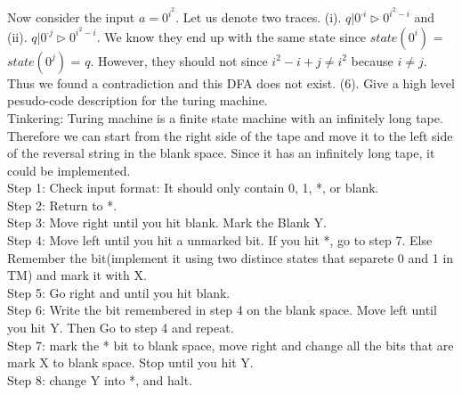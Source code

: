 \documentclass{article}
\begin{document}
	Now consider the input $a = 0^{i^2}$. Let us denote two traces. (i). $q|0^{\cdot i} \triangleright 0^{i^2-i}$ and (ii). $q|0^{\cdot j} \triangleright 0^{i^2-i}$. We know they end up with the same state since $state(0^i)$ = $state(0^j)$ = $q$.
	However, they should not since $i^2 - i +j \neq i^2$ because $i \neq j$. Thus we found a contradiction and this DFA does not exist.
	\newpage
	\noindent (6). Give a high level pesudo-code description for the turing machine.\\
	Tinkering: Turing machine is a finite state machine with an infinitely long tape. Therefore we can start from the right side of the tape and move it to the left side of the reversal string in the blank space. Since it has an infinitely long tape, it could be implemented.\\
	Step 1: Check input format: It should only contain 0, 1, *, or blank.\\
	Step 2: Return to *.\\
	Step 3: Move right until you hit blank. Mark the Blank Y.\\
	Step 4: Move left until you hit a unmarked bit. If you hit *, go to step 7. Else Remember the bit(implement it using two distince states that separete 0 and 1 in TM) and mark it with X. \\
	Step 5: Go right and until you hit blank.\\
	Step 6: Write the bit remembered in step 4 on the blank space. Move left until you hit Y. Then Go to step 4 and repeat.\\
	Step 7: mark the * bit to blank space, move right and change all the bits that are mark X to blank space. Stop until you hit Y.\\
	Step 8: change Y into *, and halt.\\
\end{document}
